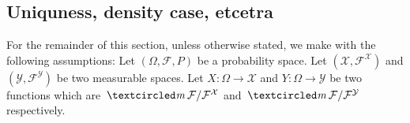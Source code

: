 \subsection{Uniquness, density case, etcetra}


\begin{sectionassumption}
For the remainder of this section, unless otherwise stated, we make with the following assumptions:
Let $(\Omega, \mathcal F, P)$ be a probability space. Let $(\mathcal X, \mathcal F^{\mathcal X})$ and $(\mathcal Y, \mathcal F^{\mathcal Y})$ be two measurable spaces. Let $X\colon \Omega \rightarrow\mathcal X$ and $Y\colon \Omega\rightarrow \mathcal Y$ be two functions which are $\mcirc \mathcal F/\mathcal F^{\mathcal X}$ and $\mcirc \mathcal F/\mathcal F^{\mathcal Y}$ respectively.
\end{sectionassumption}

\begin{theorem}
\end{theorem}


